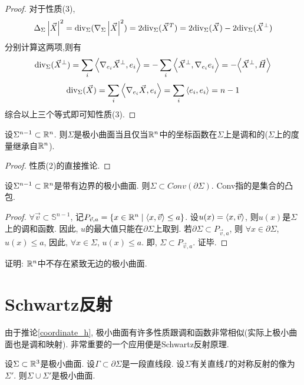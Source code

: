 \begin{proof}
    \par 对于性质(3),
    \begin{equation}
        \Delta_\Sigma\left | {\vec{X}} \right |^2={\text{div}}_\Sigma(\nabla_\Sigma\left | {\vec{X}} \right |^2) = 2{\text{div}}_\Sigma({\vec{X}}^T)=2{\text{div}}_\Sigma({\vec{X}})-2{\text{div}}_\Sigma({\vec{X}}^\perp)
    \end{equation}
    分别计算这两项,则有
    \begin{equation}
        \div_\Sigma(\XX^\perp)=\sum_i \inner{\nabla_{e_i}\XX^\perp}{e_i}=-\sum_i\inner{\XX^\perp}{\nabla_{e_i}e_i}=-\inner{\XX^\perp}{\vec{H}}%
    \end{equation}
    \begin{equation}
        {\text{div}}_\Sigma({\vec{X}})=\sum_i {\left < \nabla_{e_i}{\vec{X}}, e_i \right >}=\sum_i{\left < e_i, e_i \right >}=n-1
    \end{equation}
    综合以上三个等式即可知性质(3).
\end{proof}
\begin{corollary} \label{coordinate_h}
    设$\Sigma^{n-1}\subset \mathbb{R}^n$. 则$\Sigma$是极小曲面当且仅当$\mathbb{R}^n$中的坐标函数在$\Sigma$上是调和的($\Sigma$上的度量继承自$\mathbb{R}^n$).
\end{corollary}
\begin{proof}
    性质(2)的直接推论.
\end{proof}
\begin{corollary}
    设$\Sigma^{n-1}\subset \mathbb{R}^n$是带有边界的极小曲面. 则$\Sigma \subset Conv(\partial\Sigma)$. Conv指的是集合的凸包.
\end{corollary}
\begin{proof}
    $\forall \vec{v} \subset \mathbb{S}^{n-1}$, 记$P_{\vec{v},a}=\{x\in \mathbb{R}^n\mid {\left < x, \vec{v} \right >} \le a\}$. 设$u(x)={\left < x, \vec{v} \right >}$, 则$u(x)$是$\Sigma$上的调和函数. 因此, $u$的最大值只能在$\partial \Sigma$上取到. 若$\partial \Sigma \subset P_{\vec{v},a} $, 则 $\forall x \in \partial \Sigma$, $u(x) \le a$, 因此, $\forall x \in \Sigma$, $u(x) \le a$. 即, $\Sigma \subset P_{\vec{v},a}$. 证毕.
\end{proof}
\begin{exercise}
    证明: $\mathbb{R}^n$中不存在紧致无边的极小曲面.
\end{exercise}
\section{Schwartz反射}
由于推论\eqref{coordinate_h}, 极小曲面有许多性质跟调和函数非常相似(实际上极小曲面也是调和映射). 非常重要的一个应用便是Schwartz反射原理.
\begin{proposition} \label{min_reflection}
    设$\Sigma \subset \mathbb{R}^3$是极小曲面. 设$\Gamma \subset \partial \Sigma$是一段直线段. 设$\Sigma$有关直线$\Gamma$的对称反射的像为$\Sigma'$. 则$\Sigma \cup \Sigma'$是极小曲面.
\end{proposition}
   

